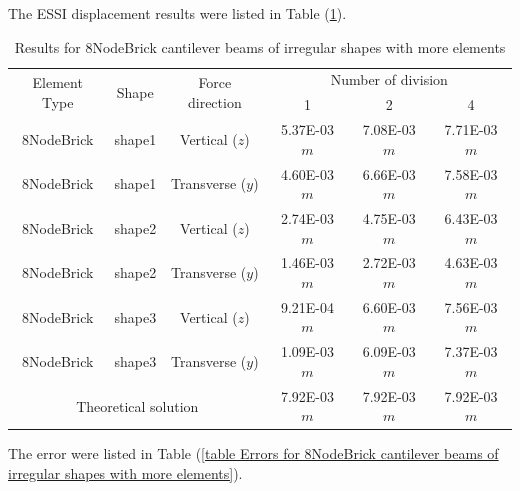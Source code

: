\documentclass[fleqn,11pt,letter]{article}
\begin{document}
The ESSI displacement results were listed in Table (\ref{table Results for 8NodeBrick cantilever beams of irregular shapes with more elements}).
\begin{table}[H]
  \centering
  \caption{Results for 8NodeBrick cantilever beams of irregular shapes with more elements}
  \label{table Results for 8NodeBrick cantilever beams of irregular shapes with more elements}
\begin{tabular}{|c|c|c|c|c|c|}
\hline
\multirow{2}{*}{Element Type} & \multirow{2}{*}{Shape}  & \multirow{2}{*}{Force direction}  & \multicolumn{3}{|c|}{Number of division} \\  \cline{4-6}
                        &        &                  &  1 &  2 &  4  \\ \hline
8NodeBrick              & shape1 & Vertical ($z$)   & 5.37E-03 $m$  & 7.08E-03 $m$  & 7.71E-03  $m$ \\ \hline
8NodeBrick              & shape1 & Transverse ($y$) & 4.60E-03 $m$  & 6.66E-03 $m$  & 7.58E-03  $m$ \\ \hline
8NodeBrick              & shape2 & Vertical ($z$)   & 2.74E-03 $m$& 4.75E-03 $m$& 6.43E-03  $m$ \\ \hline
8NodeBrick              & shape2 & Transverse ($y$) & 1.46E-03 $m$& 2.72E-03 $m$& 4.63E-03  $m$ \\ \hline
8NodeBrick              & shape3 & Vertical ($z$)   & 9.21E-04 $m$  & 6.60E-03 $m$  & 7.56E-03  $m$ \\ \hline
8NodeBrick              & shape3 & Transverse ($y$) & 1.09E-03 $m$  & 6.09E-03 $m$  & 7.37E-03  $m$ \\ \hline
 \multicolumn{3}{|c|}{Theoretical solution}      & 7.92E-03 $m$  & 7.92E-03 $m$  & 7.92E-03  $m$ \\
\hline
\end{tabular}
\end{table}

The error were listed in Table (\ref{table Errors for 8NodeBrick cantilever beams of irregular shapes with more elements}). 
\end{document}
